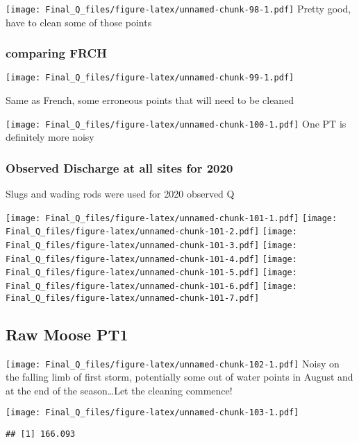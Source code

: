 \documentclass[
]{article}
\begin{document}
\texttt{[image: Final\_Q\_files/figure-latex/unnamed-chunk-98-1.pdf]}
Pretty good, have to clean some of those points

\hypertarget{comparing-frch-1}{%
\subsubsection{comparing FRCH}\label{comparing-frch-1}}

\texttt{[image: Final\_Q\_files/figure-latex/unnamed-chunk-99-1.pdf]}

Same as French, some erroneous points that will need to be cleaned

\texttt{[image: Final\_Q\_files/figure-latex/unnamed-chunk-100-1.pdf]} One
PT is definitely more noisy

\hypertarget{observed-discharge-at-all-sites-for-2020}{%
\subsubsection{Observed Discharge at all sites for
2020}\label{observed-discharge-at-all-sites-for-2020}}

Slugs and wading rods were used for 2020 observed Q

\texttt{[image: Final\_Q\_files/figure-latex/unnamed-chunk-101-1.pdf]}
\texttt{[image: Final\_Q\_files/figure-latex/unnamed-chunk-101-2.pdf]}
\texttt{[image: Final\_Q\_files/figure-latex/unnamed-chunk-101-3.pdf]}
\texttt{[image: Final\_Q\_files/figure-latex/unnamed-chunk-101-4.pdf]}
\texttt{[image: Final\_Q\_files/figure-latex/unnamed-chunk-101-5.pdf]}
\texttt{[image: Final\_Q\_files/figure-latex/unnamed-chunk-101-6.pdf]}
\texttt{[image: Final\_Q\_files/figure-latex/unnamed-chunk-101-7.pdf]}

\hypertarget{raw-moose-pt1}{%
\subsection{Raw Moose PT1}\label{raw-moose-pt1}}

\texttt{[image: Final\_Q\_files/figure-latex/unnamed-chunk-102-1.pdf]}
Noisy on the falling limb of first storm, potentially some out of water
points in August and at the end of the season\ldots Let the cleaning
commence!

\texttt{[image: Final\_Q\_files/figure-latex/unnamed-chunk-103-1.pdf]}

\begin{verbatim}
## [1] 166.093
\end{verbatim}
\end{document}
